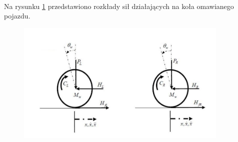 \paragraph*{}
Na rysunku \ref{fig:model_kola} przedstawiono rozkłady sił działających na koła omawianego pojazdu.

\begin{figure}[h]
	\centering
	\includegraphics[width=4in]{Figures/model_kola.jpg}
	\label{fig:model_kola}
\end{figure}